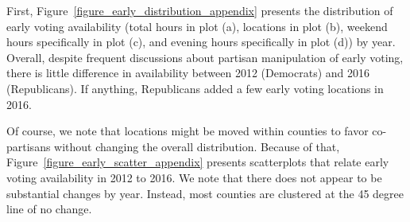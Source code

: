 \documentclass{cup_PSRM}
\begin{document}
First, Figure~\ref{figure_early_distribution_appendix} presents the distribution of early voting availability (total hours in plot (a), locations in plot (b), weekend hours specifically in plot (c), and evening hours specifically in plot (d)) by year.  Overall, despite frequent discussions about partisan manipulation of early voting, there is little difference in availability between 2012 (Democrats) and 2016 (Republicans).  If anything, Republicans added a few early voting locations in 2016.

Of course, we note that locations might be moved within counties to favor co-partisans without changing the overall distribution.  Because of that, Figure~\ref{figure_early_scatter_appendix} presents scatterplots that relate early voting availability in 2012 to 2016.  We note that there does not appear to be substantial changes by year.  Instead, most counties are clustered at the 45 degree line of no change.
\end{document}
